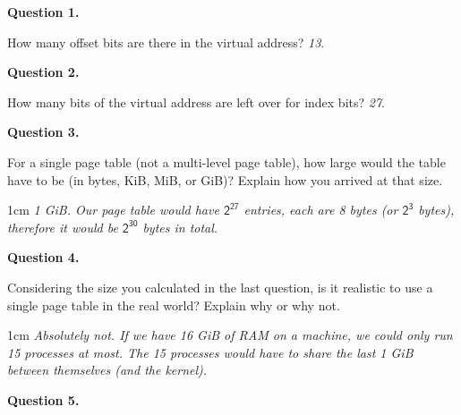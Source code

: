 \documentclass[12pt]{article}
\newenvironment{answer}{\begin{adjustwidth}{1cm}{}\itshape}{\end{adjustwidth}}
\begin{document}
\textbf{Question 1.}

\vspace{1em}

How many offset bits are there in the virtual address? \textit{13}.

\vspace{1em}

\textbf{Question 2.}

\vspace{1em}

How many bits of the virtual address are left over for index bits? \textit{27}.

\vspace{1em}

\textbf{Question 3.}

\vspace{1em}

For a single page table (not a multi-level page table), how large would the
table have to be (in bytes, KiB, MiB, or GiB)? Explain how you arrived at that
size.

\vspace{1em}

\begin{answer}
  1 GiB. Our page table would have $\mathsf{2^{27}}$ entries, each are 8 bytes
  (or $\mathsf{2^3}$ bytes), therefore it would be $\mathsf{2^{30}}$ bytes in
  total.
\end{answer}

\vspace{1em}

\textbf{Question 4.}

\vspace{1em}

Considering the size you calculated in the last question, is it realistic to use
a single page table in the real world? Explain why or why not.

\vspace{1em}

\begin{answer}
  Absolutely not. If we have 16 GiB of RAM on a machine, we could only run 15
  processes at most. The 15 processes would have to share the last 1 GiB between
  themselves (and the kernel).
\end{answer}

\vspace{1em}

\textbf{Question 5.}

\vspace{1em}
\end{document}
